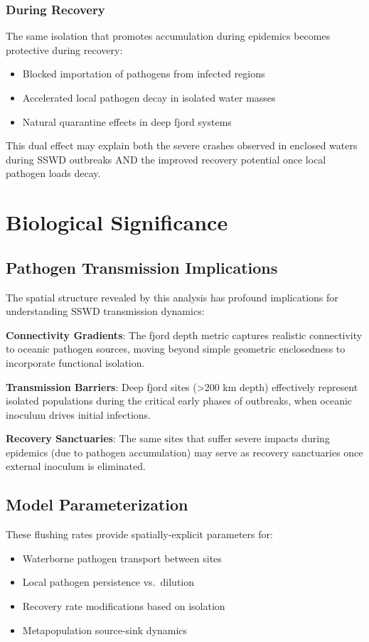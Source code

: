 \documentclass[11pt,a4paper]{article}
\begin{document}
\subsubsection{During Recovery}
The same isolation that promotes accumulation during epidemics becomes protective during recovery:
\begin{itemize}
    \item Blocked importation of pathogens from infected regions
    \item Accelerated local pathogen decay in isolated water masses
    \item Natural quarantine effects in deep fjord systems
\end{itemize}

This dual effect may explain both the severe crashes observed in enclosed waters during SSWD outbreaks AND the improved recovery potential once local pathogen loads decay.

\section{Biological Significance}

\subsection{Pathogen Transmission Implications}

The spatial structure revealed by this analysis has profound implications for understanding SSWD transmission dynamics:

\textbf{Connectivity Gradients}: The fjord depth metric captures realistic connectivity to oceanic pathogen sources, moving beyond simple geometric enclosedness to incorporate functional isolation.

\textbf{Transmission Barriers}: Deep fjord sites (>200 km depth) effectively represent isolated populations during the critical early phases of outbreaks, when oceanic inoculum drives initial infections.

\textbf{Recovery Sanctuaries}: The same sites that suffer severe impacts during epidemics (due to pathogen accumulation) may serve as recovery sanctuaries once external inoculum is eliminated.

\subsection{Model Parameterization}

These flushing rates provide spatially-explicit parameters for:
\begin{itemize}
    \item Waterborne pathogen transport between sites
    \item Local pathogen persistence vs.\ dilution
    \item Recovery rate modifications based on isolation
    \item Metapopulation source-sink dynamics
\end{itemize}
\end{document}
